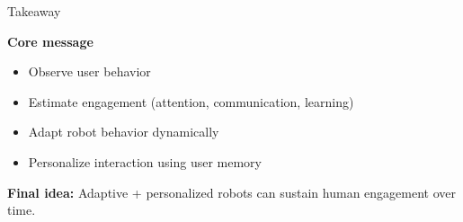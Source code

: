 \documentclass[aspectratio=169,10pt]{beamer}
\newcommand{\refnum}[1]{{\footnotesize\color{giuaccent}[#1]}}
\begin{document}

\begin{frame}{Takeaway}
\footnotesize

\textbf{Core message}

\begin{itemize}\footnotesize
    \item Observe user behavior
    \item Estimate engagement (attention, communication, learning)
    \item Adapt robot behavior dynamically
    \item Personalize interaction using user memory
\end{itemize}

\vspace{0.5em}

\textbf{Final idea:}
Adaptive + personalized robots can sustain human engagement over time.

\end{frame}

\end{document}
